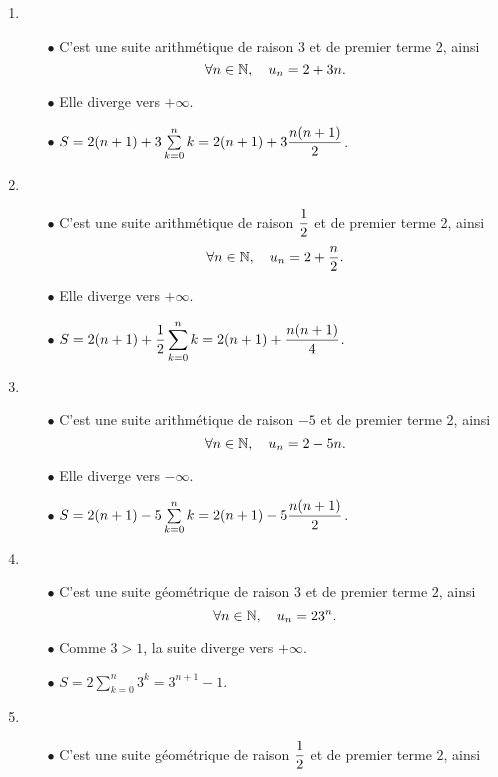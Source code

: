 \documentclass[a4paper, 11pt]{article}
\begin{document}
\begin{correction}  \;
\begin{enumerate}
 \item 
\begin{itemize}
 \item[$\bullet$] C'est une suite arithm\'etique de raison 3 et de premier terme 2, ainsi
$$\forall n\in\mathbb{N},\quad u_n=2+3n.$$
\item[$\bullet$]  Elle diverge vers $+\infty$.
\item[$\bullet$]  $S=2(n+1)+3\sum\limits_{k=0}^n k=2(n+1)+3\displaystyle\frac{n(n+1)}{2}$.
\end{itemize}
\item 
\begin{itemize}
 \item[$\bullet$] C'est une suite arithm\'etique de raison $\displaystyle\frac{1}{2}$ et de premier terme 2, ainsi
$$\forall n\in\mathbb{N},\quad u_n=2+\displaystyle\frac{n}{2}.$$
\item[$\bullet$]  Elle diverge vers $+\infty$.
\item[$\bullet$]  $S=2(n+1)+\displaystyle\frac{1}{2}\sum\limits_{k=0}^n k=2(n+1)+\displaystyle\frac{n(n+1)}{4}$.
\end{itemize}
\item 
\begin{itemize}
 \item[$\bullet$] C'est une suite arithm\'etique de raison $-5$ et de premier terme 2, ainsi
$$\forall n\in\mathbb{N},\quad u_n=2-5n.$$
\item[$\bullet$]  Elle diverge vers $-\infty$.
\item[$\bullet$]  $S=2(n+1)-5\sum\limits_{k=0}^n k=2(n+1)-5\displaystyle\frac{n(n+1)}{2}$.
\end{itemize}
\item 
\begin{itemize}
 \item[$\bullet$] C'est une suite g\'eom\'etrique de raison $3$ et de premier terme $2$, ainsi
$$\forall n\in\mathbb{N},\quad u_n=23^n.$$
\item[$\bullet$]  Comme $3>1$, la suite diverge vers $+\infty$.
\item[$\bullet$]  $S=2\sum\limits_{k=0}^n 3^k=3^{n+1}-1$.
\end{itemize}
\item 
\begin{itemize}
 \item[$\bullet$] C'est une suite g\'eom\'etrique de raison $\displaystyle\frac{1}{2}$ et de premier terme $2$, ainsi

\end{itemize}
\end{enumerate}
\end{correction}
\end{document}
